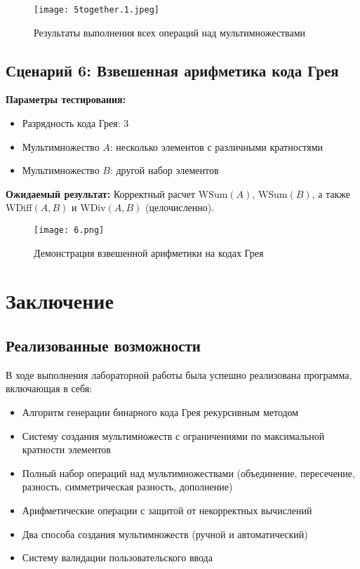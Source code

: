 \documentclass[12pt,a4paper]{article}
\begin{document}
\begin{figure}[h]
    \centering
    \texttt{[image: 5together.1.jpeg]}
    \caption{Результаты выполнения всех операций над мультимножествами}
    \label{fig:all_operations}
\end{figure}

\subsection{Сценарий 6: Взвешенная арифметика кода Грея}

\textbf{Параметры тестирования:}
\begin{itemize}
    \item Разрядность кода Грея: 3
    \item Мультимножество $A$: несколько элементов с различными кратностями
    \item Мультимножество $B$: другой набор элементов
\end{itemize}

\textbf{Ожидаемый результат:} Корректный расчет $\text{WSum}(A)$, $\text{WSum}(B)$, а также $\text{WDiff}(A,B)$ и $\text{WDiv}(A,B)$ (целочисленно).

\begin{figure}[h]
    \centering
    \texttt{[image: 6.png]}
    \caption{Демонстрация взвешенной арифметики на кодах Грея}
    \label{fig:weighted_gray}
\end{figure}

\newpage

\section*{Заключение}
\setcounter{subsection}{0}
\subsection{Реализованные возможности}

В ходе выполнения лабораторной работы была успешно реализована программа, включающая в себя:

\begin{itemize}
    \item Алгоритм генерации бинарного кода Грея рекурсивным методом
    \item Систему создания мультимножеств с ограничениями по максимальной кратности элементов
    \item Полный набор операций над мультимножествами (объединение, пересечение, разность, симметрическая разность, дополнение)
    \item Арифметические операции с защитой от некорректных вычислений
    \item Два способа создания мультимножеств (ручной и автоматический)
    \item Систему валидации пользовательского ввода
\end{itemize}
\end{document}
